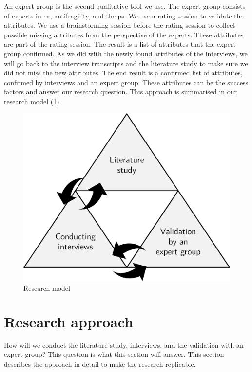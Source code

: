 An expert group is the second qualitative tool we use. The expert group consists of experts in \acrlong{ea}, \gls{antifragility}, and the \gls{ps}. We use a rating  session to validate the \glspl{attribute}. We use a brainstorming session before the rating session to collect possible missing \glspl{attribute} from the perspective of the experts. These \glspl{attribute} are part of the rating session. The result is a list of \glspl{attribute} that the expert group confirmed. As we did with the newly found \glspl{attribute} of the interviews, we will go back to the interview transcripts and the literature study to make sure we did not miss the new attributes. The end result is a confirmed list of \glspl{attribute}, confirmed by interviews and an expert group. These attributes can be the success factors and answer our research question. This approach is summarised in our research model (\cref{fig:researchmodel}).
\begin{figure}[H]
	\centering
	\includegraphics[width=0.45\linewidth]{images/researchmodel}
	\caption[Research model]{Research model}
	\label{fig:researchmodel}
\end{figure}

\section{Research approach}
\label{sec:researchapproach}
How will we conduct the literature study, interviews, and the validation with an expert group? This question is what this section will answer. This section describes the approach in detail to make the research replicable.
